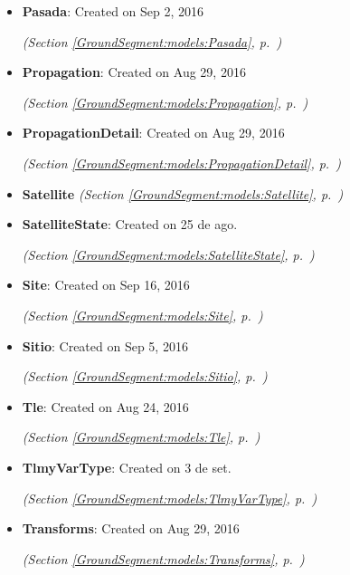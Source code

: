 \begin{itemize}
\item \textbf{Pasada}: Created on Sep 2, 2016



  \textit{(Section \ref{GroundSegment:models:Pasada}, p.~\pageref{GroundSegment:models:Pasada})}

\item \textbf{Propagation}: Created on Aug 29, 2016



  \textit{(Section \ref{GroundSegment:models:Propagation}, p.~\pageref{GroundSegment:models:Propagation})}

\item \textbf{PropagationDetail}: Created on Aug 29, 2016



  \textit{(Section \ref{GroundSegment:models:PropagationDetail}, p.~\pageref{GroundSegment:models:PropagationDetail})}

\item \textbf{Satellite}
  \textit{(Section \ref{GroundSegment:models:Satellite}, p.~\pageref{GroundSegment:models:Satellite})}

\item \textbf{SatelliteState}: Created on 25 de ago.



  \textit{(Section \ref{GroundSegment:models:SatelliteState}, p.~\pageref{GroundSegment:models:SatelliteState})}

\item \textbf{Site}: Created on Sep 16, 2016



  \textit{(Section \ref{GroundSegment:models:Site}, p.~\pageref{GroundSegment:models:Site})}

\item \textbf{Sitio}: Created on Sep 5, 2016



  \textit{(Section \ref{GroundSegment:models:Sitio}, p.~\pageref{GroundSegment:models:Sitio})}

\item \textbf{Tle}: Created on Aug 24, 2016



  \textit{(Section \ref{GroundSegment:models:Tle}, p.~\pageref{GroundSegment:models:Tle})}

\item \textbf{TlmyVarType}: Created on 3 de set.



  \textit{(Section \ref{GroundSegment:models:TlmyVarType}, p.~\pageref{GroundSegment:models:TlmyVarType})}

\item \textbf{Transforms}: Created on Aug 29, 2016



  \textit{(Section \ref{GroundSegment:models:Transforms}, p.~\pageref{GroundSegment:models:Transforms})}

\end{itemize}

